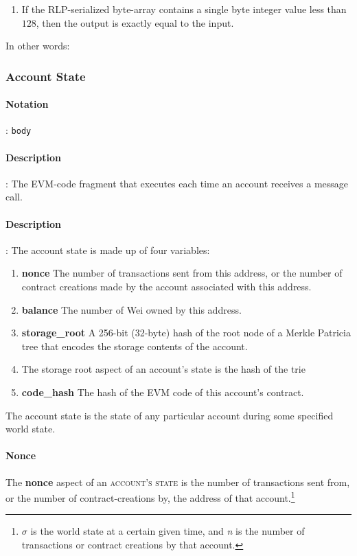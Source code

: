 \documentclass[10pt,a4paper,leqno,bibliography=totoc]{scrartcl}
\newenvironment{alphafootnotes}
{\par\edef\savedfootnotenumber{\number\value{footnote}}
\renewcommand{\thefootnote}{\alph{footnote}}
\setcounter{footnote}{0}}
{\par\setcounter{footnote}{\savedfootnotenumber}}
\begin{document}
\begin{alphafootnotes}
\begin{multicols*}{2}
				\begin{enumerate}
							\item If the RLP-serialized byte-array contains a single byte integer value less than $128$, then the output is exactly equal to the input. 
				\end{enumerate}

				In other words:
	
			\subsubsection{Account State}
				\paragraph{Notation}: \texttt{body}
				\paragraph{Description}: The EVM-code fragment that executes each time an account receives a message call. 

				\paragraph{Description}: The account state is made up of four variables:
				\begin{enumerate}
					\item \textbf{nonce} The number of transactions sent from this address, or the number of contract creations made by the account associated with this address.
					\item \textbf{balance} The number of Wei owned by this address.
					\item \textbf{storage\_root} A 256-bit (32-byte) hash of the root node of a Merkle Patricia tree that encodes the storage contents of the account.
					\item The storage root aspect of an account’s state is the hash of the trie
					\item \textbf{code\_hash} The hash of the EVM code of this account's contract.
				\end{enumerate}

				The account state is the state of any particular account during some specified world state.

    				\paragraph{Nonce} 
					The \textbf{nonce} aspect of an \textsc{account's state} is the number of transactions sent from, or the number of contract-creations by, the address of that account.\footnote{$\sigma$ is the world state at a certain given time, and \textit{n} is the number of transactions or contract creations by that account.}

\end{multicols*}
\end{alphafootnotes}
\end{document}
